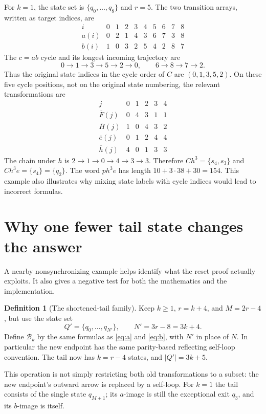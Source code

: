 \documentclass[11pt,a4paper]{article}
\numberwithin{equation}{section}
\theoremstyle{definition}
\newtheorem{definition}[theorem]{Definition}
\theoremstyle{remark}
\newcommand{\Bk}{\mathcal B_k}
\begin{document}
For $k=1$, the state set is $\{q_0,\ldots,q_8\}$ and $r=5$. The two
transition arrays, written as target indices, are
\begin{equation}\label{eq:k1arrays}
\begin{array}{c|rrrrrrrrr}
 i&0&1&2&3&4&5&6&7&8\\\hline
 a(i)&0&2&1&4&3&6&7&3&8\\
 b(i)&1&0&3&2&5&4&2&8&7
\end{array}
\end{equation}
The $c=ab$ cycle and its longest incoming trajectory are
\[
 0\to1\to3\to5\to2\to0,
 \qquad 6\to8\to7\to2.
\]
Thus the original state indices in the cycle order of $C$ are
$(0,1,3,5,2)$. On these five cycle positions,
not on the original state numbering, the relevant transformations are
\[
\begin{array}{c|rrrrr}
 j&0&1&2&3&4\\\hline
 \overline F(j)&0&4&3&1&1\\
 \overline H(j)&1&0&4&3&2\\
 \overline e(j)&0&1&2&4&4\\
 \overline h(j)&4&0&1&3&3
\end{array}
\]
The chain under $h$ is $2\to1\to0\to4\to3\to3$. Therefore
$Ch^3=\{s_4,s_3\}$ and $Ch^3e=\{s_4\}=\{q_2\}$. The word
$p h^3e$ has length $10+3\cdot38+30=154$. This example also illustrates why
mixing state labels with cycle indices would lead to incorrect formulas.

\section{Why one fewer tail state changes the answer}
\label{sec:obstruction}

A nearby nonsynchronizing example helps identify what the reset proof
actually exploits. It also gives a negative test for both the mathematics
and the implementation.

\begin{definition}[The shortened-tail family]
Keep $k\geq1$, $r=k+4$, and $M=2r-4$, but use the state set
\[
 Q'=\{q_0,\ldots,q_{N'}\},\qquad N'=3r-8=3k+4.
\]
Define $\Bk$ by the same formulas as \eqref{eq:a} and \eqref{eq:b}, with
$N'$ in place of $N$. In particular the new endpoint has the same
parity-based reflecting self-loop convention. The tail now has $k=r-4$
states, and $|Q'|=3k+5$.
\end{definition}

This operation is not simply restricting both old transformations to a
subset: the new endpoint's outward arrow is replaced by a self-loop.
For $k=1$ the tail consists of the single state $q_{M+1}$; its $a$-image
is still the exceptional exit $q_3$, and its $b$-image is itself.
\end{document}
